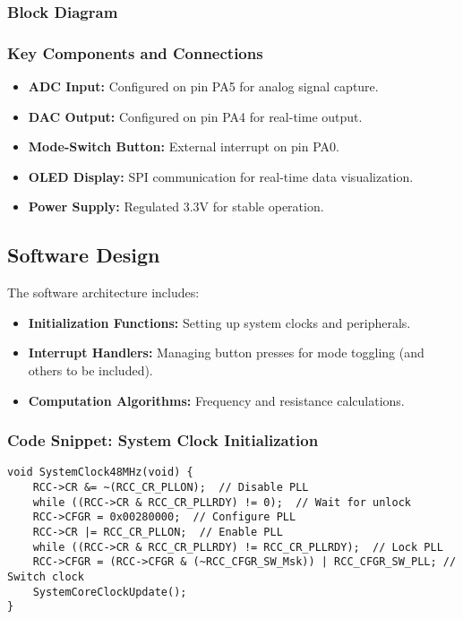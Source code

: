 \documentclass[12pt]{article}
\begin{document}
\subsubsection{Block Diagram}

\subsubsection{Key Components and Connections}
\begin{itemize}[leftmargin=2em]
    \item \textbf{ADC Input:} Configured on pin PA5 for analog signal capture.
    \item \textbf{DAC Output:} Configured on pin PA4 for real-time output.
    \item \textbf{Mode-Switch Button:} External interrupt on pin PA0.
    \item \textbf{OLED Display:} SPI communication for real-time data visualization.
    \item \textbf{Power Supply:} Regulated 3.3V for stable operation.
\end{itemize}

\subsection{Software Design}
The software architecture includes:
\begin{itemize}[leftmargin=2em]
    \item \textbf{Initialization Functions:} Setting up system clocks and peripherals.
    \item \textbf{Interrupt Handlers:} Managing button presses for mode toggling (and others to be included).
    \item \textbf{Computation Algorithms:} Frequency and resistance calculations.
\end{itemize}

\subsubsection{Code Snippet: System Clock Initialization}
\begin{lstlisting}[caption=System Clock Initialization, label=lst:SystemClockInit]
void SystemClock48MHz(void) {
    RCC->CR &= ~(RCC_CR_PLLON);  // Disable PLL
    while ((RCC->CR & RCC_CR_PLLRDY) != 0);  // Wait for unlock
    RCC->CFGR = 0x00280000;  // Configure PLL
    RCC->CR |= RCC_CR_PLLON;  // Enable PLL
    while ((RCC->CR & RCC_CR_PLLRDY) != RCC_CR_PLLRDY);  // Lock PLL
    RCC->CFGR = (RCC->CFGR & (~RCC_CFGR_SW_Msk)) | RCC_CFGR_SW_PLL; // Switch clock
    SystemCoreClockUpdate();
}
\end{lstlisting}
\end{document}
